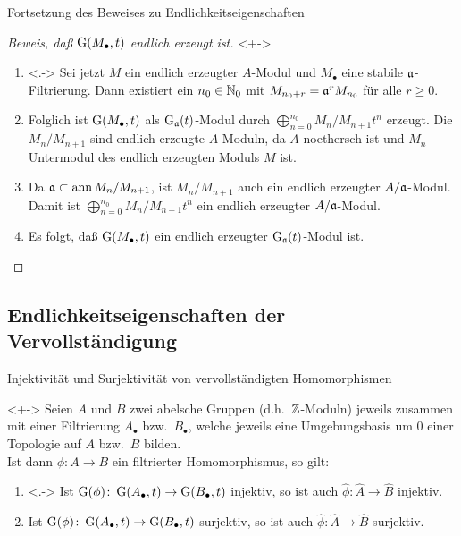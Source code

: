 \begin{frame}{Fortsetzung des Beweises zu Endlichkeitseigenschaften}
	\begin{proof}[Beweis, daß \(\operatorname{G}(M_\bullet, t)\) endlich erzeugt ist]<+->
		\begin{enumerate}[<+->]
		\item<.->
			Sei jetzt \(M\) ein endlich erzeugter \(A\)-Modul und \(M_\bullet\) eine stabile \(\mathfrak{a}\)-Filtrierung.
			Dann existiert ein \(n_0 \in \mathbb N_0\) mit \(M_{n_0 + r} = \mathfrak{a}^r M_{n_0}\) für alle \(r \ge 0\).
		\item
			Folglich ist \(\operatorname{G}(M_\bullet, t)\) als \(\operatorname{G}_{\mathfrak{a}}(t)\)-Modul durch
			\(\bigoplus\limits_{n = 0}^{n_0} M_n/M_{n + 1} t^n\) erzeugt. Die \(M_n/M_{n + 1}\) sind endlich erzeugte
			\(A\)-Moduln, da \(A\) noethersch ist und \(M_n\) Untermodul des endlich erzeugten Moduls \(M\) ist.
		\item
			Da \(\mathfrak{a} \subset \operatorname{ann} M_n/M_{n + 1}\), ist \(M_n/M_{n + 1}\) auch ein endlich erzeugter
			\(A/\mathfrak{a}\)-Modul.
			Damit ist \(\bigoplus_{n = 0}^{n_0} M_n/M_{n + 1} t^n\) ein endlich erzeugter \(A/\mathfrak{a}\)-Modul.
		\item
			Es folgt, daß \(\operatorname{G}(M_\bullet, t)\) ein endlich erzeugter \(\operatorname{G}_{\mathfrak{a}}(t)\)-Modul ist.
			\qedhere
		\end{enumerate}
	\end{proof}
\end{frame}

\subsection{Endlichkeitseigenschaften der Vervollständigung}

\begin{frame}{Injektivität und Surjektivität von vervollständigten Homomorphismen}
	\begin{lemma}<+->
		Seien \(A\) und \(B\) zwei abelsche Gruppen (d.h.\ \(\mathbb Z\)-Moduln) jeweils zusammen mit einer
		Filtrierung \(A_\bullet\) bzw.\ \(B_\bullet\), welche jeweils eine Umgebungsbasis um \(0\) einer
		Topologie auf \(A\) bzw.\ \(B\) bilden.
		\\
		Ist dann \(\phi\colon A \to B\) ein filtrierter Homomorphismus,
		so gilt:
		\begin{enumerate}[<+->]
		\item<.->
			Ist \(\operatorname{G}(\phi)\colon \operatorname{G}(A_\bullet, t) \to \operatorname{G}(B_\bullet, t)\) injektiv,
			so ist auch \(\hat\phi\colon \hat A \to \hat B\) injektiv.
		\item
			Ist \(\operatorname{G}(\phi)\colon \operatorname{G}(A_\bullet, t) \to \operatorname{G}(B_\bullet, t)\) surjektiv,
			so ist auch \(\hat\phi\colon \hat A \to \hat B\) surjektiv.
		\end{enumerate}
	\end{lemma}
\end{frame}

